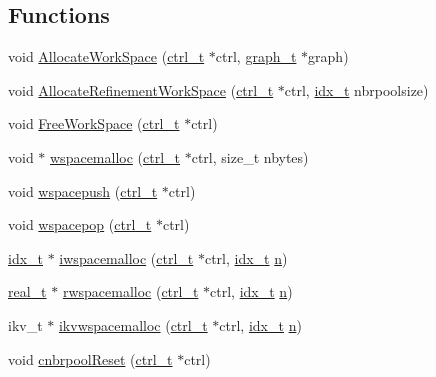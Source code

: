 \subsection*{Functions}
\begin{DoxyCompactItemize}
\item 
void \hyperlink{a00981_a38986a3bdf3ee614ee37396e8f3c149b}{Allocate\+Work\+Space} (\hyperlink{a00742}{ctrl\+\_\+t} $\ast$ctrl, \hyperlink{a00734}{graph\+\_\+t} $\ast$graph)
\item 
void \hyperlink{a00981_a2b337cc68be55b7e8b6d2218fcea855d}{Allocate\+Refinement\+Work\+Space} (\hyperlink{a00742}{ctrl\+\_\+t} $\ast$ctrl, \hyperlink{a00876_aaa5262be3e700770163401acb0150f52}{idx\+\_\+t} nbrpoolsize)
\item 
void \hyperlink{a00981_a0176e7569d59bfac1b0fc2d2fa9ac2f9}{Free\+Work\+Space} (\hyperlink{a00742}{ctrl\+\_\+t} $\ast$ctrl)
\item 
void $\ast$ \hyperlink{a00981_a555f2ae3f4e5561c9b1ef592bf0f8476}{wspacemalloc} (\hyperlink{a00742}{ctrl\+\_\+t} $\ast$ctrl, size\+\_\+t nbytes)
\item 
void \hyperlink{a00981_a90d838f5af71d196b117d443432e4646}{wspacepush} (\hyperlink{a00742}{ctrl\+\_\+t} $\ast$ctrl)
\item 
void \hyperlink{a00981_ad26c08175b8b18d7dfb86f2f8d91b09e}{wspacepop} (\hyperlink{a00742}{ctrl\+\_\+t} $\ast$ctrl)
\item 
\hyperlink{a00876_aaa5262be3e700770163401acb0150f52}{idx\+\_\+t} $\ast$ \hyperlink{a00981_a24ba749ade92aef079e88d233317c068}{iwspacemalloc} (\hyperlink{a00742}{ctrl\+\_\+t} $\ast$ctrl, \hyperlink{a00876_aaa5262be3e700770163401acb0150f52}{idx\+\_\+t} \hyperlink{a00623_a781a04ab095280f838ff3eb0e51312e0}{n})
\item 
\hyperlink{a00876_a1924a4f6907cc3833213aba1f07fcbe9}{real\+\_\+t} $\ast$ \hyperlink{a00981_a194ce386758eefa7996960b928c5d0aa}{rwspacemalloc} (\hyperlink{a00742}{ctrl\+\_\+t} $\ast$ctrl, \hyperlink{a00876_aaa5262be3e700770163401acb0150f52}{idx\+\_\+t} \hyperlink{a00623_a781a04ab095280f838ff3eb0e51312e0}{n})
\item 
ikv\+\_\+t $\ast$ \hyperlink{a00981_a84ec1bdf52bc3f92ae3f2e43c42545ca}{ikvwspacemalloc} (\hyperlink{a00742}{ctrl\+\_\+t} $\ast$ctrl, \hyperlink{a00876_aaa5262be3e700770163401acb0150f52}{idx\+\_\+t} \hyperlink{a00623_a781a04ab095280f838ff3eb0e51312e0}{n})
\item 
void \hyperlink{a00981_ab24df9968589b0cfabb8f1a8b4661d0d}{cnbrpool\+Reset} (\hyperlink{a00742}{ctrl\+\_\+t} $\ast$ctrl)
\item 

\end{DoxyCompactItemize}

